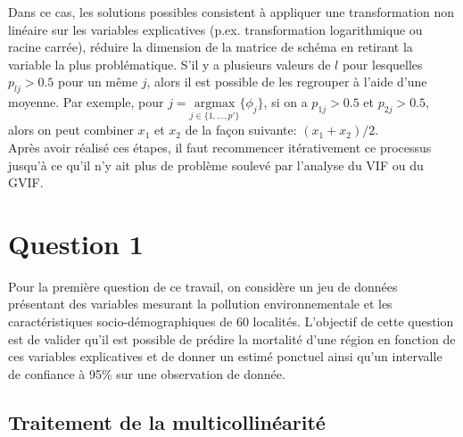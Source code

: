 \documentclass{article}
\begin{document}
Dans ce cas, les solutions possibles consistent à appliquer une transformation non linéaire sur les variables explicatives (p.ex. transformation logarithmique ou racine carrée), réduire la dimension de la matrice de schéma en retirant la variable la plus problématique. S'il y a plusieurs valeurs de $l$ pour lesquelles $p_{lj}>0.5$ pour un même $j$, alors il est possible de les regrouper à l'aide d'une moyenne. Par exemple, pour $j=\underset{j\in\{1,\dots,p'\}}{\mathrm{argmax}}\{\phi_j\}$, si on a $p_{1j}>0.5$ et $p_{2j}>0.5$, alors on peut combiner $x_1$ et $x_2$ de la façon suivante: $(x_1+x_2)/2$.\\

Après avoir réalisé ces étapes, il faut recommencer itérativement ce processus jusqu'à ce qu'il n'y ait plus de problème soulevé par l'analyse du VIF ou du GVIF.


\section{Question 1}

	Pour la première question de ce travail, on considère un jeu de données présentant des variables mesurant la pollution environnementale et les caractéristiques socio-démographiques de 60 localités. L'objectif de cette question est de valider qu'il est possible de prédire la mortalité d'une région en fonction de ces variables explicatives et de donner un estimé ponctuel ainsi qu’un intervalle de confiance à 95\% sur une observation de donnée.
	
	\subsection{Traitement de la multicollinéarité}
	
\end{document}
